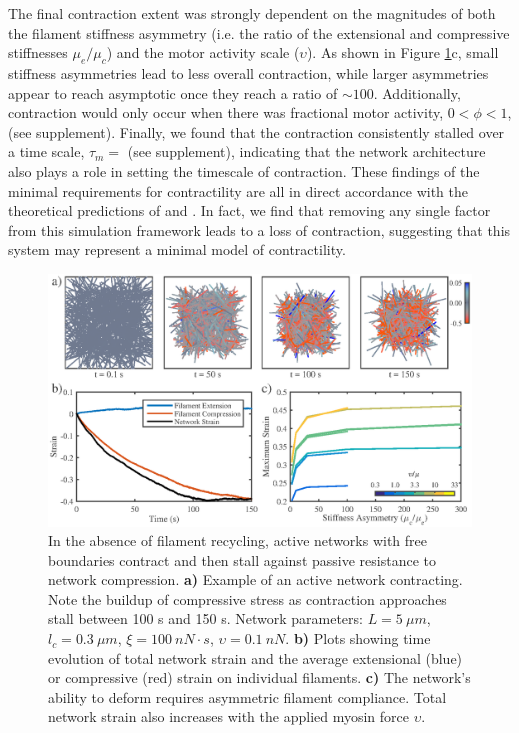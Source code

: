 \documentclass[10pt,letterpaper]{article}
\begin{document}
The final contraction extent was strongly dependent on the magnitudes of both the filament stiffness asymmetry (i.e. the ratio of the extensional and compressive stiffnesses $\mu_e/\mu_c$) and the motor activity scale ($\upsilon$).  As shown in Figure \ref{fig:active_con}c, small stiffness asymmetries lead to less overall contraction, while larger asymmetries appear to reach asymptotic once they reach a ratio of $\sim 100$.  Additionally, contraction would only occur when there was fractional motor activity, $0<\phi<1$, (see supplement).  Finally, we found that the contraction consistently stalled over a time scale, $\tau_m=$ (see supplement), indicating that the network architecture also plays a role in setting the timescale of contraction.  These findings of the minimal requirements for contractility are all in direct accordance with the theoretical predictions of \cite{1367-2630-14-3-033037} and \cite{PhysRevX.4.041002}.  In fact, we find that removing any single factor from this simulation framework leads to a loss of contraction, suggesting that this system may represent a minimal model of contractility. 

\begin{figure}[h!]
	\centering
	\includegraphics[width=\hsize]{figures/figure4a}
	\caption{\label{fig:active_con} In the absence of filament recycling, active networks with free boundaries contract and then stall against passive resistance to network compression. \textbf{a)}  Example of an active network contracting. Note the buildup of compressive stress as contraction approaches stall between 100 s and 150 s.  Network parameters: $L=5\: \mu m$, $l_c=0.3\: \mu m$, $\xi=100\: nN\cdot s$, $\upsilon=0.1\: nN$.  \textbf{b)} Plots showing time evolution of total network strain and  the average extensional (blue) or compressive (red) strain on individual filaments.   \textbf{c)} The network's ability to deform requires asymmetric filament compliance.  Total network strain also increases with the applied myosin force $\upsilon$.}
\end{figure}
\end{document}
